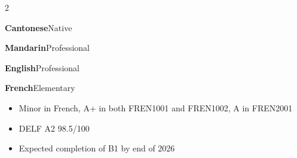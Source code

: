 \documentclass[10pt,a4paper,withhypeper,normalphoto]{altacv}
\begin{document}
\begin{paracol}{2}

\textcolor{emphasis}{\textbf{Cantonese}}\hfill Native

\divider

\textcolor{emphasis}{\textbf{Mandarin}}\hfill Professional

\divider

\textcolor{emphasis}{\textbf{English}}\hfill Professional

\divider

\textcolor{emphasis}{\textbf{French}}\hfill Elementary

\begin{itemize}
  \item Minor in French, A+ in both FREN1001 and FREN1002, A in FREN2001
  \item DELF A2 98.5/100
  \item Expected completion of B1 by end of 2026
\end{itemize}

\end{paracol}
\end{document}
